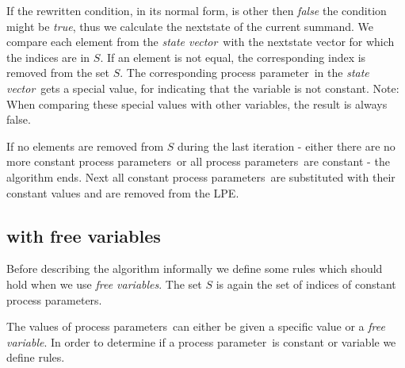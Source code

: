 \index{}\documentclass[a4paper,10pt]{article}
\theoremstyle{plain}
\theoremstyle{definition}
\newcommand{\pp}{process parameter}
\newcommand{\pps}{process parameters}
\newcommand{\ti}{\textit}
\newcommand{\sv}{\textit{state vector}}
\begin{document}
If the rewritten condition, in its normal form, is other then \ti{false} the condition might be \ti{true}, thus we calculate the nextstate of the current summand.  We compare each element from the \sv\ with the nextstate vector for which the indices are in $S$. If an element is not equal, the corresponding index is removed from the set $S$. The corresponding \pp\ in the \sv\ gets a special value, for indicating that the variable is not constant. Note: When comparing these special values with other variables, the result is always false. 

If no elements are removed from $S$ during the last iteration - either there are no more constant \pps\ or all \pps\ are constant - the algorithm ends. Next all constant \pps\ are substituted with their constant values and are removed from the LPE. 

\subsection{with free variables}
Before describing the algorithm informally we define some rules which should hold when we use \ti{free variables}. The set  $S$ is again the set of indices of constant \pps .

The values of \pps\ can either be given a specific value or a \ti{free variable}. In order to determine if a \pp\ is constant or variable we define rules.
\end{document}
